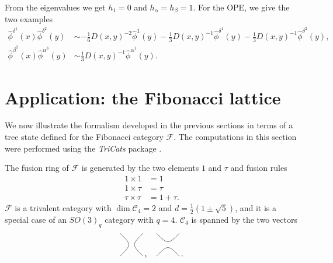 \documentclass[11pt,oneside]{amsart}
\theoremstyle{plain}%
\theoremstyle{definition}
\theoremstyle{remark}
\begin{document}
From the eigenvalues we get $h_1=0$ and $h_\alpha=h_\beta=1$. For the OPE, we give the two examples
\begin{align}
	\hat{\phi}^{\delta^1}(x)\hat{\phi}^{\delta^2}(y) &\sim -\frac{1}{6} D(x, y)^{-2} \hat{\phi}^1(y) -\frac{1}{3} D(x, y)^{-1} \hat{\phi}^{\delta^1}(y) - \frac{1}{3} D(x, y)^{-1}\hat{\phi}^{\delta^2}(y),\\
	\hat{\phi}^{\beta^2}(x)\hat{\phi}^{\alpha^3}(y) &\sim \frac{1}{3} D(x, y)^{-1} \hat{\phi}^{\alpha^1}(y).
\end{align}


\section{Application: the Fibonacci lattice}\label{sec:example2}

We now illustrate the formalism developed in the previous sections in terms of a tree state defined for the Fibonacci category $\mathcal{F}$. The computations in this section were performed using the \textit{TriCats} package \cites{stiegemannSupp,stiegemannTriCats}.

The fusion ring of $\mathcal{F}$ is generated by the two elements $1$ and $\tau$ and fusion rules
\begin{align}
	1 \times 1&= 1\\
	1 \times \tau &= \tau\\
	\tau\times\tau&=1+\tau.
\end{align}
$\mathcal{F}$ is a trivalent category with $\dim\mathcal{C}_4=2$ and $d=\frac{1}{2}(1\pm\sqrt{5})$, and it is a special case of an $\mathit{SO}(3)_q$ category with $q=4$. $\mathcal{C}_4$ is spanned by the two vectors
\begin{equation}\label{eq:fibbasis}
	\begin{tikzpicture}[scale=0.5]
    \draw (0, 0) .. controls (1, 1) .. (0, 2);
    \draw (2, 0) .. controls (1, 1) .. (2, 2);
  \end{tikzpicture}\,,\quad%
	\begin{tikzpicture}[scale=0.5]
    \draw (0, 0) .. controls (1, 1) .. (2, 0);
    \draw (0, 2) .. controls (1, 1) .. (2, 2);
  \end{tikzpicture}\,.
\end{equation}
\end{document}
